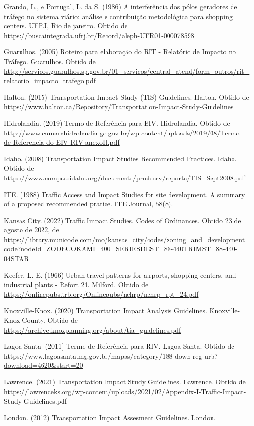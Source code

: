 \documentclass[]{article}
\begin{document}
Grando, L., e Portugal, L. da S. (1986) A interferência dos pólos
geradores de tráfego no sistema viário: análise e contribuição
metodológica para shopping centers. UFRJ, Rio de janeiro. Obtido de
\url{https://buscaintegrada.ufrj.br/Record/aleph-UFR01-000078598}

Guarulhos. (2005) Roteiro para elaboração do RIT - Relatório de Impacto
no Tráfego. Guarulhos. Obtido de
\url{http://servicos.guarulhos.sp.gov.br/01_servicos/central_atend/form_outros/rit_relatorio_impacto_trafego.pdf}

Halton. (2015) Transportation Impact Study (TIS) Guidelines. Halton.
Obtido de
\url{https://www.halton.ca/Repository/Transportation-Impact-Study-Guidelines}

Hidrolandia. (2019) Termo de Referência para EIV. Hidrolandia. Obtido de
\url{http://www.camarahidrolandia.go.gov.br/wp-content/uploads/2019/08/Termo-de-Referencia-do-EIV-RIV-anexoII.pdf}

Idaho. (2008) Transportation Impact Studies Recommended Practices.
Idaho. Obtido de
\url{https://www.compassidaho.org/documents/prodserv/reports/TIS_Sept2008.pdf}

ITE. (1988) Traffic Access and Impact Studies for site development. A
summary of a proposed recommended pratice. ITE Journal, 58(8).

Kansas City. (2022) Traffic Impact Studies. Codes of Ordinances. Obtido
23 de agosto de 2022, de
\url{https://library.municode.com/mo/kansas_city/codes/zoning_and_development_code?nodeId=ZODECOKAMI_400_SERIESDEST_88-440TRIMST_88-440-04STAR}

Keefer, L. E. (1966) Urban travel patterns for airports, shopping
centers, and industrial plants - Refort 24. Milford. Obtido de
\url{https://onlinepubs.trb.org/Onlinepubs/nchrp/nchrp_rpt_24.pdf}

Knoxville-Knox. (2020) Transportation Impact Analysis Guidelines.
Knoxville-Knox County. Obtido de
\url{https://archive.knoxplanning.org/about/tia_guidelines.pdf}

Lagoa Santa. (2011) Termo de Referência para RIV. Lagoa Santa. Obtido de
\url{https://www.lagoasanta.mg.gov.br/mapas/category/188-down-reg-urb?download=4620\&start=20}

Lawrence. (2021) Transportation Impact Study Guidelines. Lawrence.
Obtido de
\url{https://lawrenceks.org/wp-content/uploads/2021/02/Appendix-I-Traffic-Impact-Study-Guidelines.pdf}

London. (2012) Transportation Impact Assesment Guidelines. London.
\end{document}
